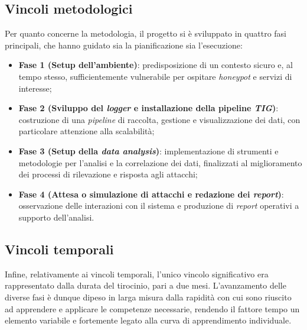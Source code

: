 \subsection{Vincoli metodologici}
Per quanto concerne la metodologia, il progetto si è sviluppato in quattro fasi principali, che hanno guidato sia la pianificazione sia l'esecuzione: 
\begin{itemize}
    \item \textbf{Fase 1 (Setup dell'ambiente)}: predisposizione di un contesto sicuro e, al tempo stesso, sufficientemente vulnerabile per ospitare \textit{honeypot} e servizi di interesse;
    \item \textbf{Fase 2 (Sviluppo del \textit{logger} e installazione della pipeline \textit{TIG})}: costruzione di una \textit{pipeline} di raccolta, gestione e visualizzazione dei dati, con particolare attenzione alla scalabilità;
    \item \textbf{Fase 3 (Setup della \textit{data analysis})}: implementazione di strumenti e metodologie per l'analisi e la correlazione dei dati, finalizzati al miglioramento dei processi di rilevazione e risposta agli attacchi;
    \item \textbf{Fase 4 (Attesa o simulazione di attacchi e redazione dei \textit{report})}: osservazione delle interazioni con il sistema e produzione di \textit{report} operativi a supporto dell'analisi.
\end{itemize}
\subsection{Vincoli temporali}
Infine, relativamente ai vincoli temporali, l'unico vincolo significativo era rappresentato dalla durata del tirocinio, pari a due mesi. L'avanzamento delle diverse fasi è dunque dipeso in larga misura dalla rapidità con cui sono riuscito ad apprendere e applicare le competenze necessarie, rendendo il fattore tempo un elemento variabile e fortemente legato alla curva di apprendimento individuale.

